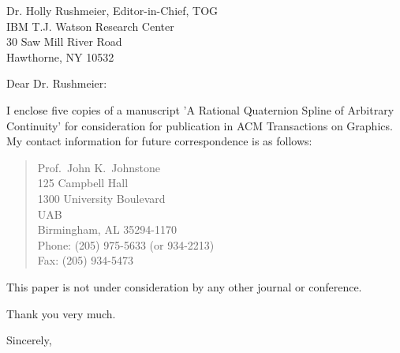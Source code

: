 \signature{John K. Johnstone}

\begin{letter}
{Dr. Holly Rushmeier, Editor-in-Chief, TOG\\
IBM T.J. Watson Research Center\\
30 Saw Mill River Road\\
Hawthorne, NY 10532
}

\opening{Dear Dr. Rushmeier:}

I enclose five copies of a manuscript 'A Rational Quaternion Spline of
Arbitrary Continuity' for consideration for publication
in ACM Transactions on Graphics.
My contact information for future correspondence is as follows:
\begin{quote}
	Prof.\ John K.\ Johnstone\\
	125 Campbell Hall\\
	1300 University Boulevard\\
	UAB\\
	Birmingham, AL 35294-1170\\
	Phone: (205) 975-5633 (or 934-2213)\\
	Fax: (205) 934-5473
\end{quote}

This paper is not under consideration by any other journal or conference.

Thank you very much.

\closing{Sincerely,}
\end{letter}



